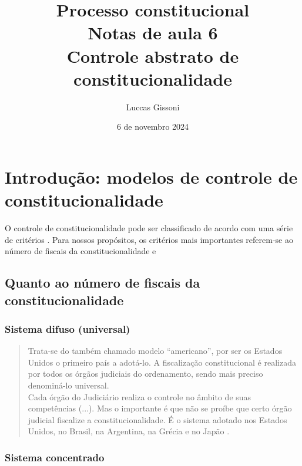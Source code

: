 \documentclass{article}
\title{%
 Processo constitucional \\
  \Large Notas de aula 6 \\
  \large Controle abstrato de constitucionalidade}
\author{Luccas Gissoni}
\date{6 de novembro 2024}
\begin{document}
\maketitle
\tableofcontents

\section{Introdução: modelos de controle de constitucionalidade}

O controle de constitucionalidade pode ser classificado de acordo com uma série de critérios \cite[cap. 2]{dimoulis_curso_2016}. Para nossos propósitos, os critérios mais importantes referem-se ao número de fiscais da constitucionalidade e 

\subsection{Quanto ao número de fiscais da constitucionalidade}

\subsubsection{Sistema difuso (universal)}

\begin{quote}
    Trata-se do também chamado modelo “americano”, por ser os Estados Unidos o primeiro país a adotá-lo. A fiscalização constitucional é realizada por todos os órgãos judiciais do ordenamento, sendo mais preciso denominá-lo universal.\\
    Cada órgão do Judiciário realiza o controle no âmbito de suas competências (...). Mas o importante é que não se proíbe que certo órgão judicial fiscalize a constitucionalidade. É o sistema adotado nos Estados Unidos, no Brasil, na Argentina, na Grécia e no Japão \cite[p. 78]{dimoulis_curso_2016}.
\end{quote}

\subsubsection{Sistema concentrado}
\end{document}
